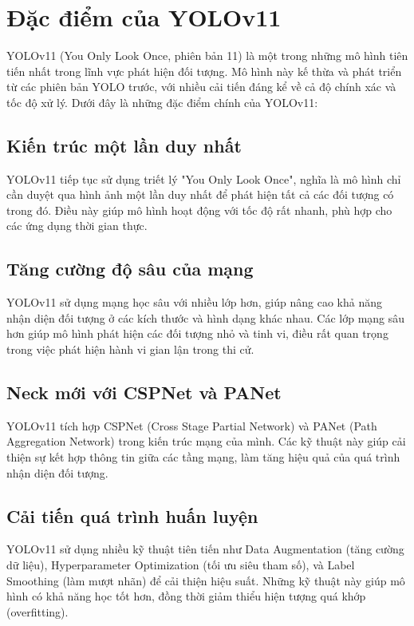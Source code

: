\documentclass[conference]{IEEEtran}
\begin{document}
\section{Đặc điểm của YOLOv11}

YOLOv11 (You Only Look Once, phiên bản 11) là một trong những mô hình tiên tiến nhất trong lĩnh vực phát hiện đối tượng. Mô hình này kế thừa và phát triển từ các phiên bản YOLO trước, với nhiều cải tiến đáng kể về cả độ chính xác và tốc độ xử lý. Dưới đây là những đặc điểm chính của YOLOv11:

\subsection{Kiến trúc một lần duy nhất}
YOLOv11 tiếp tục sử dụng triết lý "You Only Look Once", nghĩa là mô hình chỉ cần duyệt qua hình ảnh một lần duy nhất để phát hiện tất cả các đối tượng có trong đó. Điều này giúp mô hình hoạt động với tốc độ rất nhanh, phù hợp cho các ứng dụng thời gian thực.

\subsection{Tăng cường độ sâu của mạng}
YOLOv11 sử dụng mạng học sâu với nhiều lớp hơn, giúp nâng cao khả năng nhận diện đối tượng ở các kích thước và hình dạng khác nhau. Các lớp mạng sâu hơn giúp mô hình phát hiện các đối tượng nhỏ và tinh vi, điều rất quan trọng trong việc phát hiện hành vi gian lận trong thi cử.

\subsection{Neck mới với CSPNet và PANet}
YOLOv11 tích hợp CSPNet (Cross Stage Partial Network) và PANet (Path Aggregation Network) trong kiến trúc mạng của mình. Các kỹ thuật này giúp cải thiện sự kết hợp thông tin giữa các tầng mạng, làm tăng hiệu quả của quá trình nhận diện đối tượng.

\subsection{Cải tiến quá trình huấn luyện}
YOLOv11 sử dụng nhiều kỹ thuật tiên tiến như Data Augmentation (tăng cường dữ liệu), Hyperparameter Optimization (tối ưu siêu tham số), và Label Smoothing (làm mượt nhãn) để cải thiện hiệu suất. Những kỹ thuật này giúp mô hình có khả năng học tốt hơn, đồng thời giảm thiểu hiện tượng quá khớp (overfitting).
\end{document}
